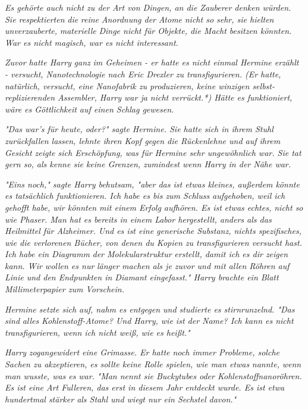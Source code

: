 {\emph{Es gehörte auch nicht zu der Art von Dingen, an die Zauberer denken würden. Sie respektierten} \emph{die} \emph{reine} \emph{\emph{Anordnung der}} \emph{\emph{Atome}} \emph{nicht so sehr, sie hielten unverzauberte,} \emph{\emph{materielle}} \emph{Dinge nicht für Objekte, die Macht besitzen könnten. War es nicht magisch, war es nicht interessant.}

\emph{Zuvor hatte Harry} \emph{\emph{ganz}} \emph{im Geheimen - er hatte es nicht einmal Hermine erzählt - versucht, Nanotechnologie nach Eric Drexler zu transfigurieren. (Er hatte, natürlich, versucht, eine Nanofabrik zu produzieren, keine winzigen selbst-replizierenden Assembler, Harry war ja nicht verrückt.*) Hätte es funktioniert, wäre es Göttlichkeit auf einen Schlag gewesen.}

\emph{"Das war's für heute, oder?" sagte Hermine. Sie hatte sich in ihrem Stuhl zurückfallen lassen, lehnte ihren Kopf gegen die Rückenlehne und auf ihrem Gesicht zeigte sich Erschöpfung, was für Hermine sehr ungewöhnlich war. Sie tat gern so, als kenne sie keine Grenzen, zumindest wenn Harry in der Nähe war.}

\emph{"Eins noch," sagte Harry behutsam, "aber das ist etwas kleines, außerdem könnte es tatsächlich funktionieren. Ich habe es bis zum Schluss aufgehoben, weil ich gehofft habe, wir könnten mit einem Erfolg aufhören. Es ist} \emph{etwas echtes, nicht so wie Phaser. Man hat es bereits in einem Labor hergestellt, anders als das Heilmittel für Alzheimer. Und es ist eine generische Substanz, nichts spezifisches, wie die verlorenen Bücher, von denen du Kopien zu transfigurieren versucht hast. Ich habe ein Diagramm} \emph{der Molekularstruktur} \emph{erstellt, damit ich es dir zeigen kann. Wir wollen es nur} \emph{\emph{länger}} \emph{machen als je zuvor und mit allen Röhren auf Linie und den Endpunkten in Diamant eingefasst." Harry brachte ein Blatt Millimeterpapier zum Vorschein.}

\emph{Hermine setzte sich auf, nahm es entgegen und studierte es stirnrunzelnd. "Das sind} \emph{\emph{alles}} \emph{Kohlenstoff-Atome? Und Harry, wie ist der Name? Ich kann es nicht transfigurieren, wenn ich nicht weiß, wie es heißt."}

\emph{Harry} \emph{zogangewidert eine Grimasse. Er hatte noch immer Probleme, solche Sachen zu akzeptieren, es sollte keine Rolle spielen, wie man etwas} \emph{\emph{nannte,}} \emph{wenn man wusste, was es} \emph{\emph{war.}} \emph{"Man nennt sie Buckytubes oder Kohlenstoffnanoröhren. Es ist eine Art Fulleren, das erst in diesem Jahr entdeckt wurde. Es ist etwa hundertmal stärker als Stahl und wiegt nur ein Sechstel davon."}

}
